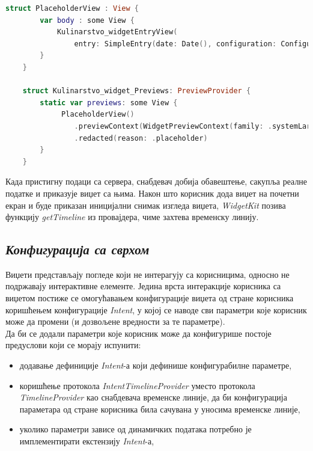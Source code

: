 \documentclass[12pt,oneside]{memoir}
\begin{document}
\begin{lstlisting}[caption=\textit{{Виџет - placeholder}}, label={lst:виџет - placeholder}, language=Swift, frame=single]
    struct PlaceholderView : View {
        var body : some View {
            Kulinarstvo_widgetEntryView(
                entry: SimpleEntry(date: Date(), configuration: ConfigurationIntent(), recipe: Datafeed.shared.favRecipes[0], parameterToShow: MainParameter.Sastojci.rawValue))
        }
    }
    
    struct Kulinarstvo_widget_Previews: PreviewProvider {
        static var previews: some View {
             PlaceholderView()
                .previewContext(WidgetPreviewContext(family: .systemLarge))
                .redacted(reason: .placeholder)
        }
    }
\end{lstlisting}

\indent Када пристигну подаци са сервера, снабдевач добија обавештење, сакупља реалне податке и приказује виџет са њима. Након што корисник дода виџет на почетни екран и буде приказан иницијални снимак изгледа виџета, \textit{WidgetKit} позива функцију \textit{getTimeline} из провајдера, чиме захтева временску линију.

\subsection{\textit{Конфигурација са сврхом}}
\label{subsec:Intent}
\indent Виџети представљају погледе који не интерагују са корисницима, односно не подржавају интерактивне елементе. Једина врста интеракције корисника са виџетом постиже се омогућавањем конфигурације виџета од стране корисника коришћењем конфигурације \textit{Intent}, у којој се наводе сви параметри које корисник може да промени (и дозвољене вредности за те параметре). 
\\
\indent Да би се додали параметри које корисник може да конфигурише постоје предуслови који се морају испунити:
\begin{itemize}
    \item додавање дефиниције \textit{Intent}-а који дефинише конфигурабилне параметре,
    \item коришћење протокола \textit{IntentTimelineProvider} уместо протокола \textit{Timeli\-neProvider} као снабдевача временске линије, да би конфигурација параметара од стране корисника била сачувана у уносима временске линије,
    \item уколико параметри зависе од динамичких података потребно је имплементирати екстензију \textit{Intent}-а,
\end{itemize}
\end{document}
